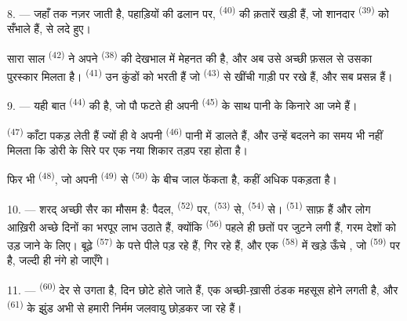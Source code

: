 8. --- जहाँ तक नज़र जाती है, पहाड़ियों की ढलान पर, 
\textsuperscript{(40)} की क़तारें खड़ी हैं, जो शानदार 
\textsuperscript{(39)} को सँभाले हैं,  से लदे हुए।

सारा साल  \textsuperscript{(42)} ने अपने
 \textsuperscript{(38)} की देखभाल में मेहनत की है, और अब उसे
अच्छी फ़सल से उसका पुरस्कार मिलता है। 
\textsuperscript{(41)} उन कुंडों को भरती हैं जो 
\textsuperscript{(43)} से खींची गाड़ी पर रखे हैं, और सब प्रसन्न हैं।

\VUsaut{5.0mm}
\VUsaut{3.4mm}

9. --- यही बात  \textsuperscript{(44)} की है, जो पौ फटते ही
अपनी  \textsuperscript{(45)} के साथ पानी के किनारे आ जमे हैं।

 \textsuperscript{(47)} काँटा पकड़ लेती हैं ज्यों ही वे
अपनी  \textsuperscript{(46)} पानी में डालते हैं, और उन्हें
 बदलने का समय भी नहीं मिलता कि डोरी के सिरे पर एक नया शिकार तड़प
रहा होता है।

फिर भी  \textsuperscript{(48)}, जो अपनी 
\textsuperscript{(49)} से  \textsuperscript{(50)} के बीच जाल फेंकता
है, कहीं अधिक पकड़ता है।

10. --- शरद् अच्छी सैर का मौसम है: पैदल,  \textsuperscript{(52)}
पर,  \textsuperscript{(53)} से,  \textsuperscript{(54)}
से।  \textsuperscript{(51)} साफ़ हैं और लोग आख़िरी अच्छे दिनों का
भरपूर लाभ उठाते हैं, क्योंकि  \textsuperscript{(56)} पहले ही छतों
पर जुटने लगी हैं, गरम देशों को उड़ जाने के लिए। बूढ़े 
\textsuperscript{(57)} के पत्ते पीले पड़ रहे हैं,  गिर रहे हैं, और एक
 \textsuperscript{(58)} में खड़े ऊँचे , जो
 \textsuperscript{(59)} पर है, जल्दी ही नंगे हो जाएँगे।

11. ---  \textsuperscript{(60)} देर से उगता है, दिन छोटे होते जाते
हैं,  एक अच्छी-ख़ासी ठंडक महसूस होने लगती है, और
 \textsuperscript{(61)} के झुंड अभी से हमारी निर्मम जलवायु छोड़कर
जा रहे हैं।
\VUsaut{6.0mm}
\VUfilet{22mm}
